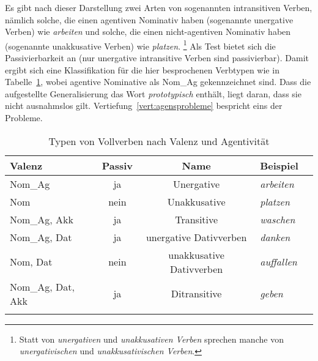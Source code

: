 

Es gibt nach dieser Darstellung zwei Arten von sogenannten intransitiven Verben, nämlich solche, die einen agentiven Nominativ haben (sogenannte unergative Verben) wie \textit{arbeiten} und solche, die einen nicht-agentiven Nominativ haben (sogenannte unakkusative Verben) wie \textit{platzen}.%
\footnote{Statt von \textit{unergativen} und \textit{unakkusativen Verben} sprechen manche von \textit{unergativischen} und \textit{unakkusativischen Verben}.}
Als Test bietet sich die Passivierbarkeit an (nur unergative intransitive Verben sind passivierbar).
Damit ergibt sich eine Klassifikation für die hier besprochenen Verbtypen wie in Tabelle~\ref{tab:vtypen}, wobei agentive Nominative als Nom\_Ag gekennzeichnet sind.
Dass die aufgestellte Generalisierung das Wort \textit{prototypisch} enthält, liegt daran, dass sie nicht ausnahmslos gilt.
Vertiefung~\ref{vert:agensprobleme} bespricht eins der Probleme.

\begin{table}
    \begin{tabular}{lccll}
      \lsptoprule
      \textbf{Valenz} & \textbf{Passiv} & \textbf{Name} & \textbf{Beispiel} \\
      \midrule
      Nom\_Ag & ja & Unergative & \textit{arbeiten} \\
      Nom & nein & Unakkusative & \textit{platzen} \\
      Nom\_Ag, Akk & ja & Transitive & \textit{waschen} \\
      Nom\_Ag, Dat & ja & unergative Dativverben & \textit{danken} \\
      Nom, Dat & nein & unakkusative Dativverben & \textit{auffallen} \\
      Nom\_Ag, Dat, Akk & ja & Ditransitive & \textit{geben} \\
      \lspbottomrule
    \end{tabular}
  \caption{Typen von Vollverben nach Valenz und Agentivität}
  \label{tab:vtypen}
\end{table}

